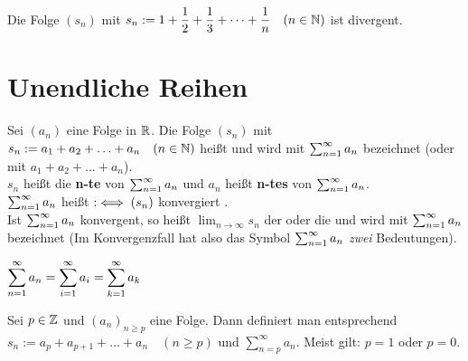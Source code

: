 \documentclass[a4paper,oneside,DIV15,BCOR12mm]{scrbook}
\begin{document}
\begin{folgerung}
Die Folge $(s_n)$ mit $\displaystyle{s_n := 1+\frac{1}{2}+\frac{1}{3}+\cdots+\frac{1}{n}\quad(n\in\ensuremath{\mathbb{N}})}$ ist divergent.
\end{folgerung}

\chapter{Unendliche Reihen}

\begin{definition}
Sei $(a_n)$ eine Folge in $\mathbb{R}$. Die Folge $(s_n)$ mit $s_n := a_1+a_2+\ldots+a_n\quad(n\in\mathbb{N})$ heißt  und wird mit $\sum_{n=1}^{\infty}{a_n}$ bezeichnet (oder mit $a_1+a_2+\ldots+a_n$).\\
$s_n$ heißt die \textbf{n-te } von $\sum_{n=1}^{\infty}{a_n}$ und $a_n$ heißt \textbf{n-tes } von $\sum_{n=1}^{\infty}{a_n}$.\\
$\sum_{n=1}^{\infty}{a_n}$ heißt   $:\iff (s_n)$ konvergiert .\\
Ist $\sum_{n=1}^{\infty}{a_n}$ konvergent, so heißt $\lim_{n\to\infty}{s_n}$ der  oder die  und wird mit $\sum_{n=1}^{\infty}{a_n}$ bezeichnet (Im Konvergenzfall hat also das Symbol $\sum_{n=1}^{\infty}{a_n}$ \emph{zwei} Bedeutungen).
\end{definition}

\begin{bemerkung}
\begin{liste}
\item $\displaystyle{\sum_{n=1}^{\infty}{a_n}= \sum_{i=1}^{\infty}{a_i} = \sum_{k=1}^{\infty}{a_k}}$
\item Sei $p\in\mathbb{Z}$ und $(a_n)_{n \ge p}$ eine Folge. Dann definiert man entsprechend $s_n := a_p+a_{p+1}+\ldots+a_n\quad(n \ge p)$ und $\sum_{n=p}^{\infty}{a_n}$. Meist gilt: $p=1$ oder $p=0$.
\end{liste}
\end{bemerkung}
\end{document}
